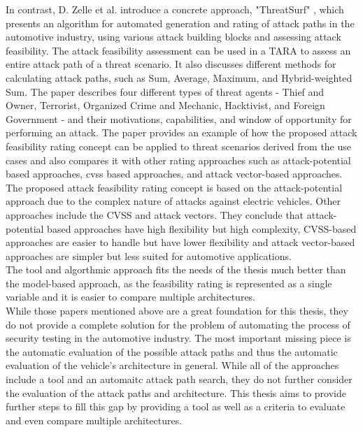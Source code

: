 In contrast, D. Zelle et al. introduce a concrete approach, "ThreatSurf" \cite{threat_surf}, which presents an algorithm for automated generation and rating of 
attack paths in the automotive industry, using various attack building blocks and assessing attack feasibility.
The attack feasibility assessment can be used in a TARA to assess an entire attack path of a threat scenario.
It also discusses different methods for calculating attack paths, such as Sum, Average, Maximum, and Hybrid-weighted Sum. 
The paper describes four different types of threat agents - Thief and Owner, Terrorist, Organized Crime and Mechanic, Hacktivist, and Foreign Government - 
and their motivations, capabilities, and window of opportunity for performing an attack. 
The paper provides an example of how the proposed attack feasibility rating concept can be applied to threat scenarios derived from the use cases and also 
compares it with other rating approaches such as attack-potential based approaches, \gls{cvss} based approaches, and attack vector-based approaches.
The proposed attack feasibility rating concept is based on the attack-potential approach due to the complex nature of attacks against electric vehicles.
Other approaches include the CVSS and attack vectors.
They conclude that attack-potential based approaches have high flexibility but high complexity, 
CVSS-based approaches are easier to handle but have lower flexibility and attack vector-based approaches are simpler but less suited for automotive applications.\\
The tool and algorthmic approach fits the needs of the thesis much better than the model-based approach, as the feasibility rating is represented as a single variable and it is easier to compare multiple architectures.\\

While those papers mentioned above are a great foundation for this thesis, they do not provide a complete solution for the problem of automating the process of security testing in the automotive industry.
The most important missing piece is the automatic evaluation of the possible attack paths and thus the automatic evaluation of the vehicle's architecture in general.
While all of the approaches include a tool and an automaitc attack path search, they do not further consider the evaluation of the attack paths and architecture.
This thesis aims to provide further steps to fill this gap by providing a tool as well as a criteria to evaluate and even compare multiple architectures.





